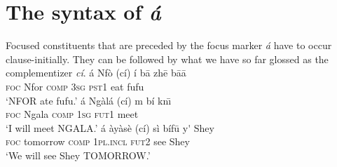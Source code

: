 \documentclass[output=paper,
modfonts
]{langscibook}
\begin{document}
\ea  \label{ex:becker:uni1}
\settowidth{}
\z \z 

\ea  \label{ex:becker:uni2}
\settowidth{}
\z \z 


\section{The syntax of \textit{\'a}}\label{sec:syntax}
Focused constituents that are preceded by the focus marker {\em \'a} have to occur clause-initially. They can be followed by what we have so far glossed as the complementizer {\em c\'i}.
\ea
\settowidth{}
\ea \label{ex:becker:s7}
\gll \'{a} {Nf\`{o}} (c\'{i}) \'{i} b\=a zh\=e b\=a\=a\\  
     \textsc{foc} {Nfor} \textsc{comp} \textsc{3sg} \textsc{pst1} eat fufu\\ 
\glt `NFOR ate fufu.'
\ex \label{ex:becker:s8}
\gll \'{a} {Ng\`{a}l\'{a}} (c\'{i}) m b\'{i} kn\={\i}\\  
     \textsc{foc} {Ngala} \textsc{comp} \textsc{1sg} \textsc{fut1} meet\\ 
\glt `I will meet NGALA.'
\ex \label{ex:becker:s9}
\gll \'a {\`ay\`as\`e} (c\'i) s\`i b\'if\=u y{\'{\textepsilon}} Shey\\  
     \textsc{foc} {tomorrow} \textsc{comp} \textsc{1pl.incl}  \textsc{fut2} see Shey\\ 
\glt `We will see Shey TOMORROW.'
\z \z
\end{document}
